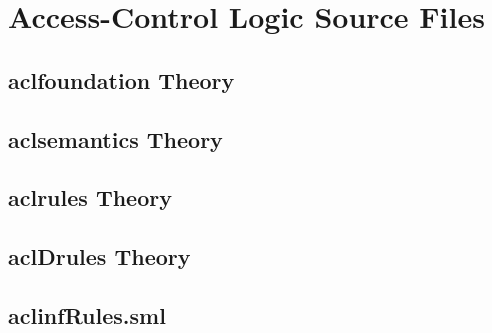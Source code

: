 
\chapter{Access-Control Logic Source Files}
\label{cha:acl-source-files}

\section{aclfoundation Theory}

\begin{scriptsize}


%     

\end{scriptsize}

\section{aclsemantics Theory}

\begin{scriptsize}


%     

\end{scriptsize}

\section{aclrules Theory}

\begin{scriptsize}



%     

\end{scriptsize}

\section{aclDrules Theory}

\begin{scriptsize}


%     

\end{scriptsize}

\section{aclinfRules.sml}

